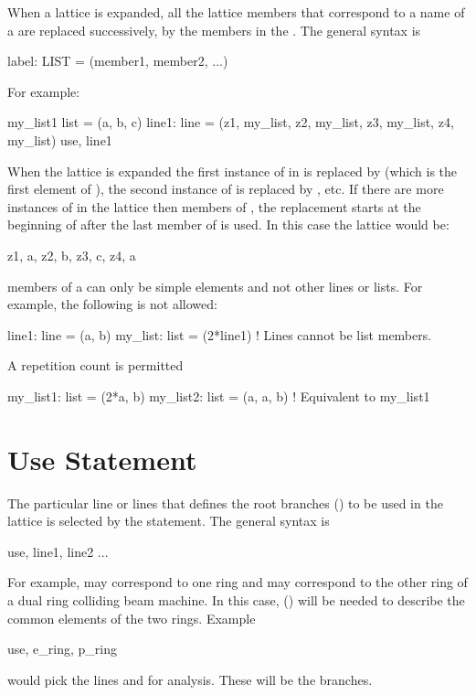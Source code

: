 When a lattice is expanded, all the lattice members that correspond to a name of a  are
replaced successively, by the members in the . The general syntax is
\begin{example}
  label: LIST = (member1, member2, ...)
\end{example}
For example:
\begin{example}
  my_list1 list = (a, b, c)
  line1: line = (z1, my_list, z2, my_list, z3, my_list, z4, my_list)
  use, line1
\end{example}
When the lattice is expanded the first instance of  in  is replaced by 
(which is the first element of ), the second instance of  is replaced by
, etc. If there are more instances of  in the lattice then members of
, the replacement starts at the beginning of  after the last member of
 is used. In this case the lattice would be:
\begin{example}
  z1, a, z2, b, z3, c, z4, a
\end{example}
members of a  can only be simple elements and not other lines or lists. 
For example, the following is not allowed:
\begin{example}
  line1: line = (a, b)
  my_list: list = (2*line1)  ! Lines cannot be list members.
\end{example}
A repetition count is permitted
\begin{example}
  my_list1: list = (2*a, b) 
  my_list2: list = (a, a, b) ! Equivalent to my_list1
\end{example}

\section{Use Statement}
\label{s:use}

The particular line or lines that defines the root branches () to be used in the
lattice is selected by the  statement. The general syntax is
\begin{example}
  use, line1, line2 ...
\end{example}
For example,  may correspond to one ring and  may correspond to the other ring
of a dual ring colliding beam machine. In this case,  () will be
needed to describe the common elements of the two rings. Example
\begin{example}
  use, e_ring, p_ring
\end{example}
would pick the lines  and  for analysis.  These will be the 
branches.

